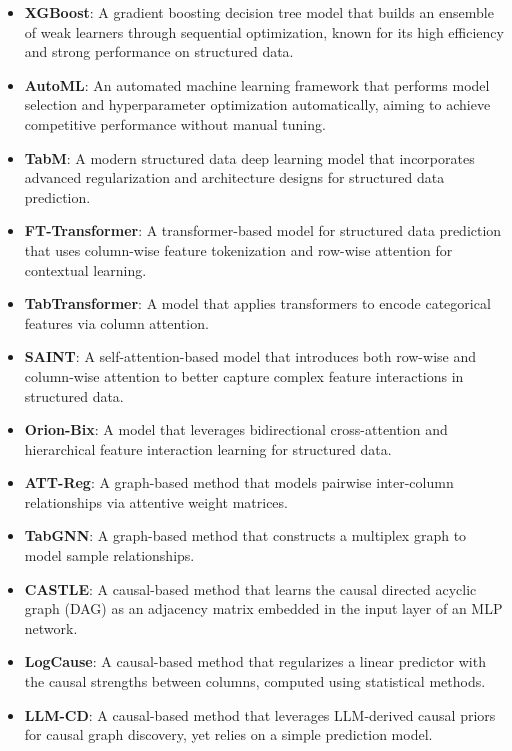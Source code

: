 \documentclass[sigconf, nonacm]{acmart}
\newcommand{\vldb}[1]{{\color{red}#1}}
\begin{document}
\vldb{
\begin{itemize}
    \item \textbf{XGBoost}: A gradient boosting decision tree model that builds an ensemble of weak learners through sequential optimization, known for its high efficiency and strong performance on structured data.
    
    \item \textbf{AutoML}: An automated machine learning framework that performs model selection and hyperparameter optimization automatically, aiming to achieve competitive performance without manual tuning.
    
    \item \textbf{TabM}: A modern structured data deep learning model that incorporates advanced regularization and architecture designs for structured data prediction.
    
    \item \textbf{FT-Transformer}: A transformer-based model for structured data prediction that uses column-wise feature tokenization and row-wise attention for contextual learning.
    
    \item \textbf{TabTransformer}: A model that applies transformers to encode categorical features via column attention.
    
    \item \textbf{SAINT}: A self-attention-based model that introduces both row-wise and column-wise attention to better capture complex feature interactions in structured data.
    
    \item \textbf{Orion-Bix}: A model that leverages bidirectional cross-attention and hierarchical feature interaction learning for structured data.
    
    \item \textbf{ATT-Reg}: A graph-based method that models pairwise inter-column relationships via attentive weight matrices.
    
    \item \textbf{TabGNN}: A graph-based method that constructs a multiplex graph to model sample relationships.
    
    \item \textbf{CASTLE}: A causal-based method that learns the causal directed acyclic graph (DAG) as an adjacency matrix embedded in the input layer of an MLP network.
    
    \item \textbf{LogCause}: A causal-based method that regularizes a linear predictor with the causal strengths between columns, computed using statistical methods.
    
    \item \textbf{LLM-CD}: A causal-based method that leverages LLM-derived causal priors for causal graph discovery, yet relies on a simple prediction model.
\end{itemize}
}
\end{document}
